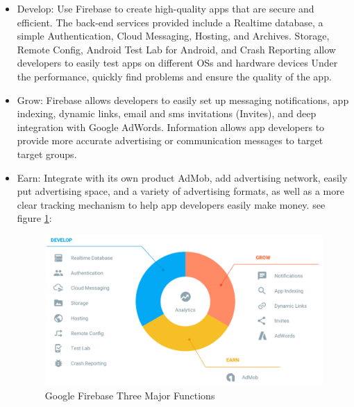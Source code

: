 \begin{itemize}
\item Develop: Use Firebase to create high-quality apps that are secure and efficient. The back-end services provided include a Realtime database, a simple Authentication, Cloud Messaging, Hosting, and Archives. Storage, Remote Config, Android Test Lab for Android, and Crash Reporting allow developers to easily test apps on different OSs and hardware devices Under the performance, quickly find problems and ensure the quality of the app.
\item Grow: Firebase allows developers to easily set up messaging notifications, app indexing, dynamic links, email and sms invitations (Invites), and deep integration with Google AdWords. Information allows app developers to provide more accurate advertising or communication messages to target target groups.
\item Earn: Integrate with its own product AdMob, add advertising network, easily put advertising space, and a variety of advertising formats, as well as a more clear tracking mechanism to help app developers easily make money. see figure \ref{fig:5.4 cubed graph}:
\begin{figure}[h]
	\centering
	\includegraphics[scale=0.6]{img/firebase1.png}
	\caption{Google Firebase Three Major Functions}
	\label{fig:5.4 cubed graph}
\end{figure}
\end{itemize}
